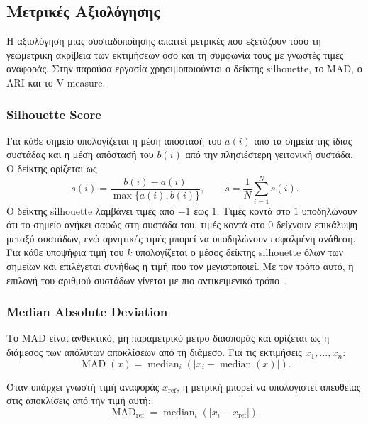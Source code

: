 \subsection{Μετρικές Αξιολόγησης}

Η αξιολόγηση μιας συσταδοποίησης απαιτεί μετρικές που εξετάζουν τόσο τη γεωμετρική ακρίβεια των εκτιμήσεων όσο και τη συμφωνία τους με γνωστές τιμές αναφοράς. Στην παρούσα εργασία χρησιμοποιούνται ο δείκτης silhouette, το MAD, ο ARI και το V-measure.

\subsubsection{Silhouette Score}

Για κάθε σημείο υπολογίζεται η μέση απόστασή του $a(i)$ από τα σημεία της ίδιας συστάδας και η μέση απόστασή του $b(i)$ από την πλησιέστερη γειτονική συστάδα. Ο δείκτης ορίζεται ως
\begin{equation}
s(i)=\frac{b(i)-a(i)}{\max\{a(i),b(i)\}},
\qquad
\bar{s}=\frac{1}{N}\sum_{i=1}^{N}s(i).
\label{eq:mean-silhouette}
\end{equation}
Ο δείκτης silhouette λαμβάνει τιμές από $-1$ έως $1$. Τιμές κοντά στο $1$ υποδηλώνουν ότι το σημείο ανήκει σαφώς στη συστάδα του, τιμές κοντά στο $0$ δείχνουν επικάλυψη μεταξύ συστάδων, ενώ αρνητικές τιμές μπορεί να υποδηλώνουν εσφαλμένη ανάθεση. Για κάθε υποψήφια τιμή του $k$ υπολογίζεται ο μέσος δείκτης silhouette όλων των σημείων και επιλέγεται συνήθως η τιμή που τον μεγιστοποιεί. Με τον τρόπο αυτό, η επιλογή του αριθμού συστάδων γίνεται με πιο αντικειμενικό τρόπο~\cite{ROUSSEEUW198753}.

\subsubsection{Median Absolute Deviation}

Το \textenglish{MAD} είναι ανθεκτικό, μη παραμετρικό μέτρο διασποράς και ορίζεται ως η διάμεσος των απόλυτων αποκλίσεων από τη διάμεσο. Για τις εκτιμήσεις $x_1,\ldots,x_n$:
\begin{equation}
\operatorname{MAD}(x)=\operatorname{median}_{i}\left(|x_i-\operatorname{median}(x)|\right).
\label{eq:mad-general}
\end{equation}

Όταν υπάρχει γνωστή τιμή αναφοράς $x_{\mathrm{ref}}$, η μετρική μπορεί να υπολογιστεί απευθείας στις αποκλίσεις από την τιμή αυτή:
\begin{equation}
\operatorname{MAD}_{\mathrm{ref}}=\operatorname{median}_{i}\left(|x_i-x_{\mathrm{ref}}|\right).
\label{eq:mad-reference}
\end{equation}

